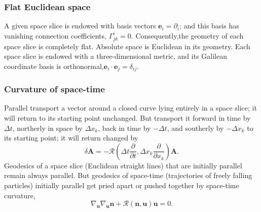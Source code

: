 \subsubsection{Flat Euclidean space}
A given space slice is endowed with basis vectors $\bm{e}_i =\partial_i$; and this basis has vanishing connection coefficients, $\Gamma^i_{jk} = 0$. Consequently,the geometry of each space slice is completely flat. Absolute space is Euclidean in its geometry. 
Each space slice is endowed with a three-dimensional metric, and its Galilean coordinate basis is orthonormal,$\bm{e}_i \cdot \bm{e}_j = \delta_{ij}$.

\subsubsection{Curvature of space-time}
Parallel transport a vector around a closed curve lying entirely in a space slice; it will return to its starting point unchanged.
But transport it forward in time by $\Delta t$, northerly in space by $\Delta x_k$, back in time by $-\Delta t$, and southerly by $-\Delta x_k$ to its starting point; it will return changed by
\[\delta \bm{A} = -\mathcal{R}(\Delta t \frac{\partial}{\partial t},\Delta x_k \frac{\partial}{\partial x_k}) \bm{A}.\]
Geodesics of a space slice (Euclidean straight lines) that are initially parallel remain always parallel. But geodesics of space-time (trajectories of freely falling particles) initially parallel get pried apart or pushed together by space-time curvature,
\[\nabla_{\bm{u}} \nabla_{\bm{u}} \bm{n} + \mathcal{R}(\bm{n},\bm{u})\bm{u} = 0.\]

